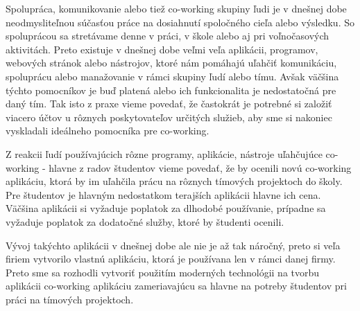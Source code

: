 \indent Spolupráca, komunikovanie alebo tiež co-working skupiny ľudi je v dnešnej dobe neodmysliteľnou súčasťou práce na dosiahnutí spoločného cieľa alebo výsledku. So spoluprácou sa stretávame denne v práci, v škole alebo aj pri voľnočasových aktivitách. Preto existuje v dnešnej dobe veľmi veľa aplikácii, programov, webových stránok alebo nástrojov, ktoré nám pomáhajú uľahčiť komunikáciu, spoluprácu alebo manažovanie v rámci skupiny ľudí alebo tímu. Avšak väčšina týchto pomocníkov je buď platená alebo ich funkcionalita je nedostatočná pre daný tím. Tak isto z praxe vieme povedať, že častokrát je potrebné si založiť viacero účtov u rôznych poskytovateľov určitých služieb, aby sme si nakoniec vyskladali ideálneho pomocníka pre co-working.

\indent Z reakcii ľudí používajúcich rôzne programy, aplikácie, nástroje uľahčujúce co-working - hlavne z radov študentov vieme povedať, že by ocenili novú co-working aplikáciu, ktorá by im uľahčila prácu na rôznych tímových projektoch do školy. Pre študentov je hlavným nedostatkom terajších aplikácii hlavne ich cena. Väčšina aplikácii si vyžaduje poplatok za dlhodobé používanie, prípadne sa vyžaduje poplatok za dodatočné služby, ktoré by študenti ocenili. 

\indent Vývoj takýchto aplikácii v dnešnej dobe ale nie je až tak náročný, preto si veľa firiem vytvorilo vlastnú aplikáciu, ktorá je používana len v rámci danej firmy. Preto sme sa rozhodli vytvoriť použitím moderných technológii na tvorbu aplikácii co-working aplikáciu zameriavajúcu sa hlavne na potreby študentov pri práci na tímových projektoch.  